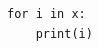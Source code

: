 \documentclass{article}
\begin{document}
\begin{lstlisting}[xleftmargin=2em]
for i in x:
    print(i)
\end{lstlisting}
\end{document}
